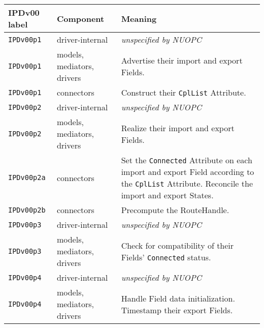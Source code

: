 \vspace*{2ex}
\begin{longtable}[h]{|p{35mm}|p{4cm}|p{6cm}|}
     \hline\hline
     {\bf IPDv00 label} & {\bf Component} & {\bf Meaning}\\
     \hline\hline
     {\tt IPDv00p1} & driver-internal             & {\em unspecified by NUOPC}\\ \hline
     {\tt IPDv00p1} & models, mediators, drivers  & Advertise their import and export Fields.\\ \hline
     {\tt IPDv00p1} & connectors                  & Construct their {\tt CplList} Attribute.\\ \hline
     {\tt IPDv00p2} & driver-internal             & {\em unspecified by NUOPC}\\ \hline
     {\tt IPDv00p2} & models, mediators, drivers  & Realize their import and export Fields.\\ \hline
     {\tt IPDv00p2a}& connectors                  & Set the {\tt Connected} Attribute on each import and export Field according to the {\tt CplList} Attribute. Reconcile the import and export States.\\ \hline
     {\tt IPDv00p2b}& connectors                  & Precompute the RouteHandle.\\ \hline
     {\tt IPDv00p3} & driver-internal             & {\em unspecified by NUOPC}\\ \hline
     {\tt IPDv00p3} & models, mediators, drivers  & Check for compatibility of their Fields' {\tt Connected} status.\\ \hline
     {\tt IPDv00p4} & driver-internal             & {\em unspecified by NUOPC}\\ \hline
     {\tt IPDv00p4} & models, mediators, drivers  & Handle Field data initialization. Timestamp their export Fields.\\
     \hline\hline
\end{longtable}

